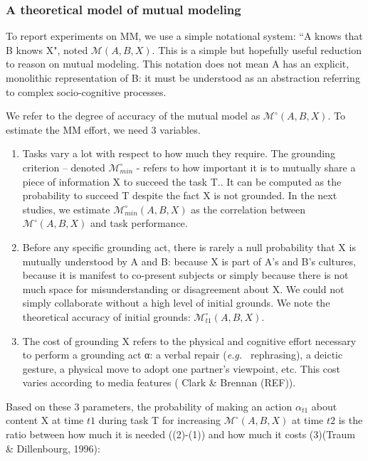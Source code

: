 \documentclass{report}
\newcommand{\eg}{{\textit{e.g.\ }}}
\newcommand{\model}[3]{{$\mathcal{M}(#1, #2, #3)$}}
\newcommand{\Model}[3]{{$\mathcal{M}^{\circ}(#1, #2, #3)$}}
\begin{document}
\subsubsection{A theoretical model of mutual modeling}


To report experiments on MM, we use a simple notational system: ``A knows that B
knows X", noted \model{A}{B}{X}. This is a simple but hopefully useful reduction to
reason on mutual modeling. This notation does not mean A has an explicit,
monolithic representation of B: it must be understood as an abstraction referring to complex
socio-cognitive processes.

We refer to the degree of accuracy of the mutual model as
\Model{A}{B}{X}. To estimate the MM effort, we need 3 variables.

\begin{enumerate}

    \item Tasks vary a lot with respect to how much they require.  The grounding
        criterion – denoted $\mathcal{M}^{\circ}_{min}$  - refers to how
        important it is to mutually share a piece of information X to succeed
        the task T.. It can be computed as the probability to succeed T despite
        the fact X is not grounded. In the next studies, we estimate
        $\mathcal{M}^{\circ}_{min}(A,B,X)$ as the correlation between
        \Model{A}{B}{X} and task performance. 

    \item Before any specific grounding act, there is rarely a null probability
        that X is mutually understood by A and B: because X is part of A's and
        B's cultures, because it is manifest to co-present subjects or simply
        because there is not much space for misunderstanding or disagreement
        about X. We could not simply collaborate without a high level of initial
        grounds. We note the theoretical accuracy of initial grounds:
        $\mathcal{M}^{\circ}_{t1}(A,B,X)$.

    \item The cost of grounding X refers to the physical and cognitive effort
        necessary to perform a grounding act α: a verbal repair (\eg
        rephrasing), a deictic gesture, a physical move to adopt one partner's
        viewpoint, etc. This cost varies according to media features ( Clark \&
        Brennan (REF)). 

\end{enumerate}

Based on these 3 parameters, the probability of making an action $\alpha_{t1}$ about
content X at time $t1$ during task T for increasing \Model{A}{B}{X}
at time $t2$ is the ratio between how much it is needed  ((2)-(1)) and how much it
costs (3)(Traum \& Dillenbourg, 1996):
\end{document}
